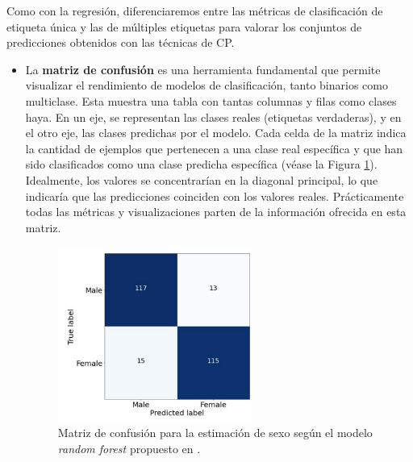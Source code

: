 Como con la regresión, diferenciaremos entre las métricas de clasificación de etiqueta única y las de
múltiples etiquetas para valorar los conjuntos de predicciones obtenidos con las técnicas de CP.

\begin{itemize}

    \item La \textbf{matriz de confusión} es una herramienta fundamental que permite visualizar el rendimiento 
    de modelos de clasificación, tanto binarios como multiclase. Esta muestra una tabla con tantas columnas y 
    filas como clases haya. En un eje, se representan las clases reales (etiquetas verdaderas), y en el otro 
    eje, las clases predichas por el modelo. Cada celda de la matriz indica la cantidad de ejemplos que 
    pertenecen a una clase real específica y que han sido clasificados como una clase predicha específica 
    (véase la Figura \ref{fig:conf_matrix_binary}).
    Idealmente, los valores se concentrarían en la diagonal principal, lo que indicaría que las predicciones 
    coinciden con los valores reales.
    Prácticamente todas las métricas y visualizaciones parten de la información ofrecida en esta matriz. 

    \begin{figure}[h]
        \centering
        \includegraphics[width=0.6\textwidth]{capitulos/cap_02/imagenes/confusion_matrix_binary.png}
        \caption{
            Matriz de confusión para la estimación de sexo según el modelo \textit{random forest} 
            propuesto en \cite{bidmos2023}.
        } 
        \label{fig:conf_matrix_binary}
    \end{figure}
    
    

\end{itemize}
